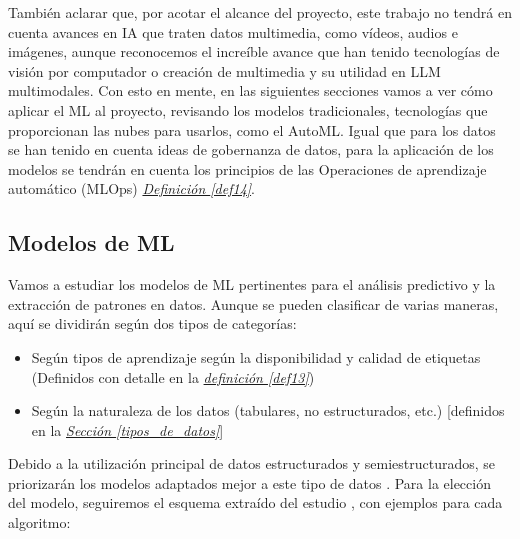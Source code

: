También aclarar que, por acotar el alcance del proyecto, este trabajo no tendrá en cuenta avances en IA que traten datos multimedia, como vídeos, audios e imágenes, aunque reconocemos el increíble avance que han tenido tecnologías de visión por computador o creación de multimedia y su utilidad en LLM multimodales. Con esto en mente, en las siguientes secciones vamos a ver cómo aplicar el ML al proyecto, revisando los modelos tradicionales, tecnologías que proporcionan las nubes para usarlos, como el AutoML. Igual que para los datos se han tenido en cuenta ideas de gobernanza de datos, para la aplicación de los modelos se tendrán en cuenta los principios de las Operaciones de aprendizaje automático (MLOps) \hyperref[def14]{\textit{Definición \ref*{def14}}}.

\subsection{Modelos de ML}

Vamos a estudiar los modelos de ML pertinentes para el análisis predictivo y la extracción de patrones en datos. Aunque se pueden clasificar de varias maneras, aquí se dividirán según dos tipos de categorías:
\begin{itemize}
	\item Según tipos de aprendizaje según la disponibilidad y calidad de etiquetas (Definidos con detalle en la \hyperref[def13]{\textit{definición \ref*{def13}}})
	\item Según la naturaleza de los datos (tabulares, no estructurados, etc.) [definidos en la \hyperref[tipos_de_datos]{\textit{Sección \ref{tipos_de_datos}}}]
\end{itemize}

Debido a la utilización principal de datos estructurados y semiestructurados, se priorizarán los modelos adaptados mejor a este tipo de datos \citep{Fowdur2021}. Para la elección del modelo, seguiremos el esquema extraído del estudio \citep{Jason2024MLTypes}, con ejemplos para cada algoritmo: \\

